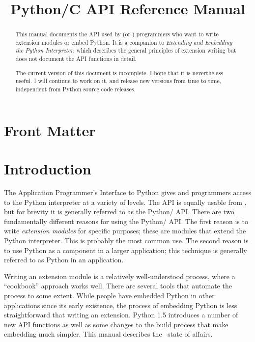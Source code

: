 \documentclass{manual}
\title{Python/C API Reference Manual}
\begin{document}
\maketitle

\ifhtml
\chapter*{Front Matter\label{front}}
\fi



\begin{abstract}

\noindent
This manual documents the API used by \C{} (or \Cpp{}) programmers who
want to write extension modules or embed Python.  It is a companion to
\emph{Extending and Embedding the Python Interpreter}, which describes
the general principles of extension writing but does not document the
API functions in detail.

 The current version of this document is incomplete.
I hope that it is nevertheless useful.  I will continue to work on it,
and release new versions from time to time, independent from Python
source code releases.

\end{abstract}

\tableofcontents


\chapter{Introduction \label{intro}}

The Application Programmer's Interface to Python gives \C{} and \Cpp{}
programmers access to the Python interpreter at a variety of levels.
The API is equally usable from \Cpp{}, but for brevity it is generally
referred to as the Python/\C{} API.  There are two fundamentally
different reasons for using the Python/\C{} API.  The first reason is
to write \emph{extension modules} for specific purposes; these are
\C{} modules that extend the Python interpreter.  This is probably the
most common use.  The second reason is to use Python as a component in
a larger application; this technique is generally referred to as
 Python in an application.

Writing an extension module is a relatively well-understood process, 
where a ``cookbook'' approach works well.  There are several tools 
that automate the process to some extent.  While people have embedded 
Python in other applications since its early existence, the process of 
embedding Python is less straightforward that writing an extension.  
Python 1.5 introduces a number of new API functions as well as some 
changes to the build process that make embedding much simpler.  
This manual describes the \version\ state of affairs.
\end{document}
